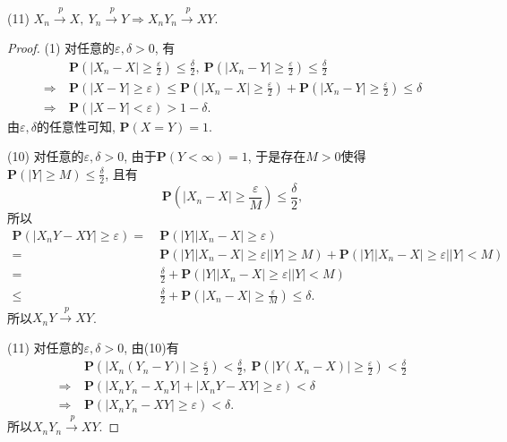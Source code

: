 \documentclass[12pt, a4paper, oneside]{ctexart}
\let\leq=\leqslant %
\let\geq=\geqslant %
\def\pra{\xrightarrow{\ \ p\ }}     %
\def\P{\textbf{P}}      %
\begin{document}
(11) $X_n\pra X,\ Y_n\pra Y\Rightarrow X_nY_n\pra XY$.
\begin{proof}
    (1) 对任意的$\varepsilon,\delta > 0$, 有
    \begin{align*}
        &\ \P(|X_n-X|\geq \frac{\varepsilon}{2})\leq \frac{\delta}{2},\ \P(|X_n-Y|\geq \frac{\varepsilon}{2})\leq \frac{\delta}{2}\\
        \Rightarrow&\ \P(|X-Y|\geq \varepsilon)\leq \P(|X_n-X|\geq \frac{\varepsilon}{2})+ \P(|X_n-Y|\geq \frac{\varepsilon}{2})\leq \delta\\
        \Rightarrow&\ \P(|X-Y|< \varepsilon) > 1-\delta.
    \end{align*}
    由$\varepsilon, \delta$的任意性可知, $\P(X=Y) = 1$.

    (10) 对任意的$\varepsilon,\delta > 0$, 由于$\P(Y < \infty) = 1$, 于是存在$M>0$使得$\P(|Y|\geq M) \leq \frac{\delta}{2}$, 且有
    \begin{equation*}
        \P(|X_n-X|\geq \frac{\varepsilon}{M})\leq \frac{\delta}{2},
    \end{equation*}
    所以
    \begin{align*}
        \P(|X_nY-XY|\geq \varepsilon)  =&\ \P(|Y||X_n-X|\geq \varepsilon)\\
        =&\ \P\left(|Y||X_n-X|\geq \varepsilon\biggl||Y|\geq M\right) + \P\left(|Y||X_n-X|\geq \varepsilon\biggl||Y| < M\right)\\
        =&\ \frac{\delta}{2} + \P\left(|Y||X_n-X|\geq \varepsilon\biggl||Y| < M\right)\\
        \leq&\ \frac{\delta}{2} + \P\left(|X_n-X|\geq \frac{\varepsilon}{M}\right)\leq \delta.
    \end{align*}
    所以$X_nY\pra XY$.

    (11) 对任意的$\varepsilon, \delta > 0$, 由(10)有
    \begin{align*}
        &\ \P(|X_n(Y_n-Y)|\geq\frac{\varepsilon}{2}) < \frac{\delta}{2},\ \P(|Y(X_n-X)|\geq \frac{\varepsilon}{2}) < \frac{\delta}{2}\\
        \Rightarrow&\ \P(|X_nY_n-X_nY|+|X_nY-XY|\geq \varepsilon) < \delta\\
        \Rightarrow&\ \P(|X_nY_n-XY|\geq \varepsilon) < \delta.
    \end{align*}
    所以$X_nY_n\pra XY$.
\end{proof}
\end{document}
